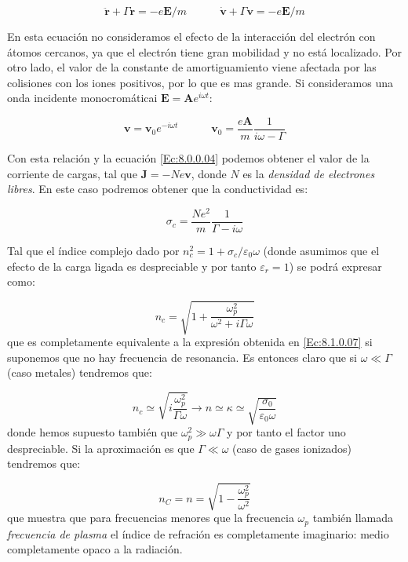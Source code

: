 \documentclass[12pt,a4paper]{article}
\newcommand{\tquad}{\quad \quad \quad}
\newcommand{\En}{\mathbf{E}}
\newcommand{\Jn}{\mathbf{J}}
\newcommand{\vn}{\mathbf{v}}
\newcommand{\rn}{\mathbf{r}}
\newcommand{\An}{\mathbf{A}}
\numberwithin{equation}{section}
\numberwithin{figure}{section}
\begin{document}
\begin{equation}
\ddot{\rn} + \Gamma \dot{\rn} = - e \En / m \tquad \dot{\vn} + \Gamma \vn = - e \En / m
\end{equation}

En esta ecuación no consideramos el efecto de la interacción del electrón con átomos cercanos, ya que el electrón tiene gran mobilidad y no está localizado. Por otro lado, el valor de la constante de amortiguamiento viene afectada por las colisiones con los iones positivos, por lo que es mas grande. Si consideramos una onda incidente monocromáticai  $\En = \An e^{i \omega t}$:

\begin{equation}
\vn = \vn_0 e^{-i \omega t} \tquad \vn_0 = \dfrac{e \An}{m} \dfrac{1}{i \omega - \Gamma}
\end{equation}

Con esta relación y la ecuación \ref{Ec:8.0.0.04} podemos obtener el valor de la corriente de cargas, tal que $\Jn = - N e \vn$, donde $N$ es la \textit{densidad de electrones libres}. En este caso podremos obtener que la conductividad es:

\begin{equation}
\sigma_c = \dfrac{N e^2}{m} \dfrac{1}{\Gamma-i \omega}
\end{equation}

Tal que el índice complejo dado por $n_c^2 = 1+ \sigma_c/\varepsilon_0 \omega$ (donde asumimos que el efecto de la carga ligada es despreciable y por tanto $\varepsilon_r = 1$) se podrá expresar como:

\begin{equation}
n_c = \sqrt{1+\dfrac{\omega_p^2}{\omega^2+ i \Gamma \omega}}
\end{equation}
que es completamente equivalente a la expresión obtenida en \ref{Ec:8.1.0.07} si suponemos que no hay frecuencia de resonancia. Es entonces claro que si $\omega \ll \Gamma$ (caso metales) tendremos que:

\begin{equation}
n_c \simeq \sqrt{i \dfrac{\omega^2_p}{\Gamma \omega}} \longrightarrow n \simeq \kappa \simeq \sqrt{\dfrac{\sigma_0}{\varepsilon_0 \omega}}
\end{equation}
donde hemos supuesto también que $\omega_p^2 \gg \omega \Gamma$ y por tanto el factor uno despreciable. Si la aproximación es que $\Gamma \ll \omega$ (caso de gases ionizados) tendremos que:

\begin{equation}
n_C = n = \sqrt{1-\dfrac{\omega^2_p}{\omega^2}}
\end{equation}
que muestra que para frecuencias menores que la frecuencia $\omega_p$ también llamada \textit{frecuencia de plasma} el índice de refración es completamente imaginario: medio completamente opaco a la radiación.
\end{document}
